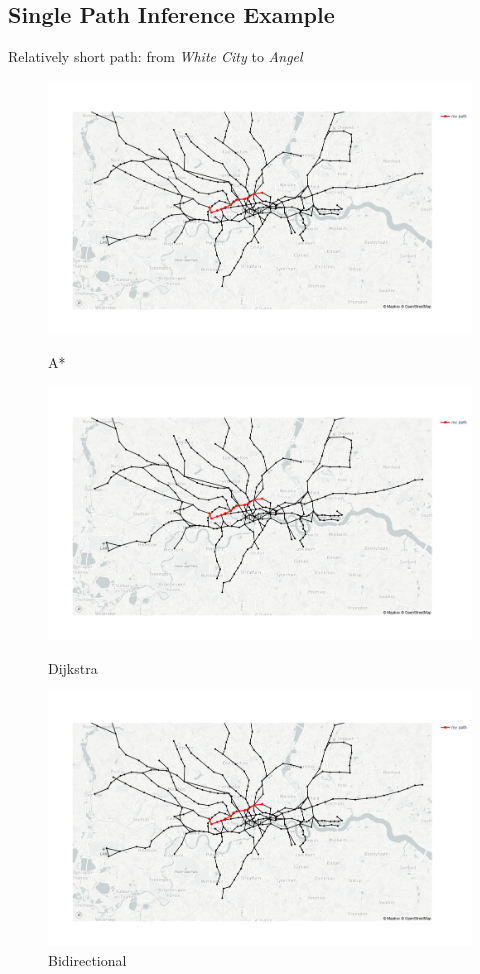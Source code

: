 \documentclass{article}
\begin{document}
	\subsection*{Single Path Inference Example}
	Relatively short path: from \textit{White City} to \textit{Angel}
	\begin{figure}[H]
		\begin{minipage}{0.32\textwidth}
			\includegraphics[width=\linewidth]{(short)_Astar.png}
			\caption{A*}
		\end{minipage}\hfill
		\begin{minipage}{0.32\textwidth}
			\includegraphics[width=\linewidth]{(short)_Dijkstra.png}
			\caption{Dijkstra}
		\end{minipage}\hfill
		\begin{minipage}{0.32\textwidth}
			\includegraphics[width=\linewidth]{(short)_Bidirectional.png}
			\caption{Bidirectional}
		\end{minipage}
	\end{figure}
	
\end{document}
